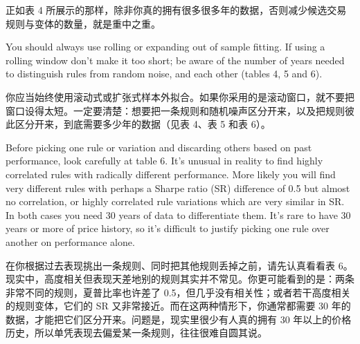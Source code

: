 \begin{chineseblock}正如表 4 所展示的那样，除非你真的拥有很多很多年的数据，否则减少候选交易规则与变体的数量，就是重中之重。\end{chineseblock}


\begin{englishblock} You should always use rolling or expanding out of sample fitting. If using a rolling window don't make it too short; be aware of the number of years needed to distinguish rules from random noise, and each other (tables 4, 5 and 6). \end{englishblock}

\begin{chineseblock}你应当始终使用滚动式或扩张式样本外拟合。如果你采用的是滚动窗口，就不要把窗口设得太短。一定要清楚：想要把一条规则和随机噪声区分开来，以及把规则彼此区分开来，到底需要多少年的数据（见表 4、表 5 和表 6）。\end{chineseblock}


\begin{englishblock} Before picking one rule or variation and discarding others based on past performance, look carefully at table 6. It's unusual in reality to find highly correlated rules with radically different performance. More likely you will find very different rules with perhaps a Sharpe ratio (SR) difference of 0.5 but almost no correlation, or highly correlated rule variations which are very similar in SR. In both cases you need 30 years of data to differentiate them. It's rare to have 30 years or more of price history, so it's difficult to justify picking one rule over another on performance alone. \end{englishblock}

\begin{chineseblock}在你根据过去表现挑出一条规则、同时把其他规则丢掉之前，请先认真看看表 6。现实中，高度相关但表现天差地别的规则其实并不常见。你更可能看到的是：两条非常不同的规则，夏普比率也许差了 0.5，但几乎没有相关性；或者若干高度相关的规则变体，它们的 SR 又非常接近。而在这两种情形下，你通常都需要 30 年的数据，才能把它们区分开来。问题是，现实里很少有人真的拥有 30 年以上的价格历史，所以单凭表现去偏爱某一条规则，往往很难自圆其说。\end{chineseblock}



